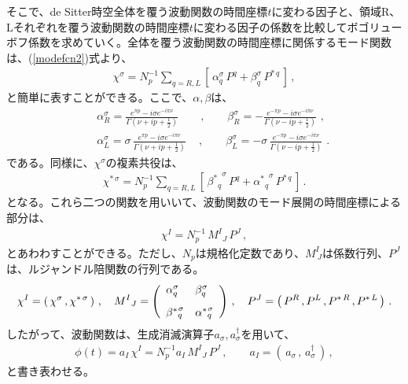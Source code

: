 そこで、de Sitter時空全体を覆う波動関数の時間座標$t$に変わる因子と、領域R、Lそれぞれを覆う波動関数の時間座標$t$に変わる因子の係数を比較してボゴリューボフ係数を求めていく。全体を覆う波動関数の時間座標に関係するモード関数は、(\ref{modefcn2})式より、
\begin{eqnarray}
\chi^{\sigma} = N_p^{-1} \sum_{q=R,L} \left[\,
 \alpha_q^\sigma\,P^q + \beta_q^\sigma\,P^{*\,q}
\,\right]\,,
\label{sty2}
\end{eqnarray}
と簡単に表すことができる。ここで、$\alpha,\beta$は、
\begin{eqnarray}
&&\alpha_R^\sigma = \frac{e^{\pi p} -i\sigma e^{-i\pi \nu}}{\Gamma (\nu+ip +\frac{1}{2})}\qquad,\qquad
\beta_R^\sigma =-\frac{e^{-\pi p} -i\sigma e^{-i\pi \nu}}{\Gamma (\nu-ip +\frac{1}{2})} \,\,,\\
&&\alpha_L^\sigma =\sigma\,\frac{e^{\pi p} -i\sigma e^{-i\pi \nu}}{\Gamma (\nu+ip +\frac{1}{2})}
\quad\,,\qquad
\beta_L^\sigma =-\sigma\,\frac{e^{-\pi p} -i\sigma e^{-i\pi \nu}}{\Gamma (\nu-ip +\frac{1}{2})}   \,\,.
\end{eqnarray}
である。同様に、$\chi^{\sigma}$の複素共役は、
\begin{eqnarray}
\chi^{*\,\sigma}=N_p^{-1}\sum_{q=R,L} \left[\,
{\beta^{*}{}_q}^{\!\!\!\sigma}\,P^q + {\alpha^{*}{}_q}^{\!\!\!\sigma}\,P^{*\,q}
\,\right]\,.
\end{eqnarray}
となる。これら二つの関数を用いいて、波動関数のモード展開の時間座標による部分は、
\begin{eqnarray}
\chi^I=N_p^{-1}\,M^I{}_J\,P^J\,,
\end{eqnarray}
とあわわすことができる。ただし、$N_{p}$は規格化定数であり、$M^{I}_{\ J}$は係数行列、$P^{J}$は、ルジャンドル陪関数の行列である。
\begin{eqnarray}
\chi^I=\left(\,\chi^\sigma\,,\chi^{*\,\sigma}\,\right)\,,\quad
M^I{}_J=\left(
\begin{array}{ll}
\alpha^\sigma_q & \beta^\sigma_q \vspace{3mm}\\
{\beta^{*}{}_q}^{\!\!\!\sigma} & {\alpha^{*}{}_q}^{\!\!\!\sigma} \\
\end{array}\right)\,,\quad
P^J=\left(\,P^R\,,P^L\,,P^{*\,R}\,, P^{*\,L}\,\right)\,.
\end{eqnarray}
したがって、波動関数は、生成消滅演算子$a_{\sigma},a_{\sigma}^{\dagger}$を用いて、
\begin{eqnarray}
\phi(t)=a_I\,\chi^I=N_p^{-1}a_I\,M^I{}_J\,P^J\,,\qquad
a_I=\left(\,a_\sigma\,,\,a_\sigma^\dagger\,\right)\,,
\label{phi2}
\end{eqnarray}
と書き表わせる。


